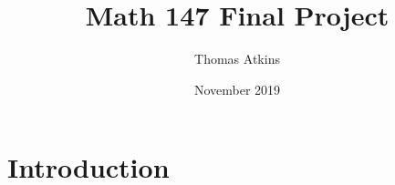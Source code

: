 \documentclass{article}
\title{Math 147 Final Project}
\author{Thomas Atkins}
\date{November 2019}
\begin{document}
\maketitle

\section{Introduction}
\end{document}
